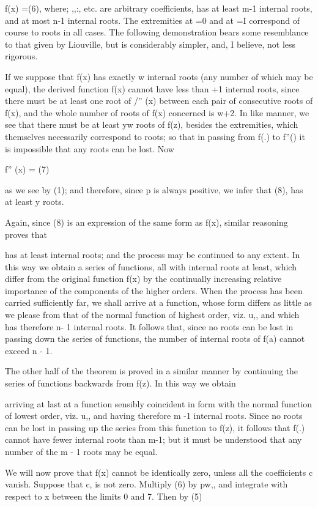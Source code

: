 f(x) =(6),
where; ,,:, etc. are arbitrary coefficients, has at least m-1 internal
roots, and at most n-1 internal roots. The extremities at =0 and at =I
correspond of course to roots in all cases. The following demonstration
bears some resemblance to that given by Liouville, but is considerably
simpler, and, I believe, not less rigorous.

If we suppose that f(x) has exactly w internal roots (any number of
which may be equal), the derived function f(x) cannot have less than +1
internal roots, since there must be at least one root of /'' (x) between
each pair of consecutive roots of f(x), and the whole number of roots of
f(x) concerned is w+2. In like manner, we see that there must be at
least yw roots of f(z), besides the extremities, which themselves
necessarily correspond to roots; so that in passing from f(.) to f''()
it is impossible that any roots can be lost. Now

f'' (x) = (7)

as we see by (1); and therefore, since p is always positive, we infer
that (8), has at least y roots.

Again, since (8) is an expression of the same form as f(x), similar
reasoning proves that

has at least internal roots; and the process may be continued to any
extent. In this way we obtain a series of functions, all with internal
roots at least, which differ from the original function f(x) by the
continually increasing relative importance of the components of the
higher orders. When the process has been carried sufficiently far, we
shall arrive at a function, whose form differs as little as we please
from that of the normal function of highest order, viz. u,, and which
has therefore n- 1 internal roots. It follows that, since no roots can
be lost in passing down the series of functions, the number of internal
roots of f(a) cannot exceed n - 1.

The other half of the theorem is proved in a similar manner by
continuing the series of functions backwards from f(z). In this way we
obtain

arriving at last at a function sensibly coincident in form with the
normal function of lowest order, viz. u,, and having therefore m -1
internal roots. Since no roots can be lost in passing up the series from
this function to f(z), it follows that f(.) cannot have fewer internal
roots than m-1; but it must be understood that any number of the m - 1
roots may be equal.

We will now prove that f(x) cannot be identically zero, unless all the
coefficients c vanish. Suppose that c, is not zero. Multiply (6) by pw,,
and integrate with respect to x between the limits 0 and 7. Then by (5)

